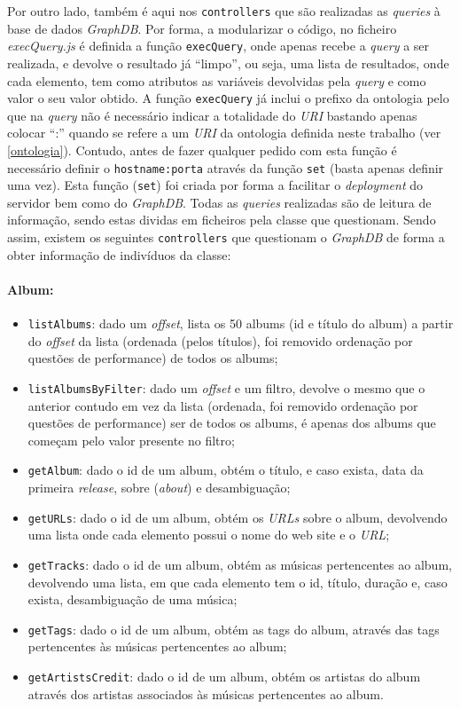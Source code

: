 \documentclass{article}
\begin{document}
Por outro lado, também é aqui nos \texttt{controllers} que são realizadas as \textit{queries} à base de dados \textit{GraphDB}. Por forma, a modularizar o código, no ficheiro \textit{execQuery.js} é definida a função \texttt{execQuery}, onde apenas recebe a \textit{query} a ser realizada, e devolve o resultado já ``limpo'', ou seja, uma lista de resultados, onde cada elemento, tem como atributos as variáveis devolvidas pela \textit{query} e como valor o seu valor obtido. A função \texttt{execQuery} já inclui o prefixo da ontologia pelo que na \textit{query} não é necessário indicar a totalidade do \textit{URI} bastando apenas colocar ``:'' quando se refere a um \textit{URI} da ontologia definida neste trabalho (ver \ref{ontologia}). Contudo, antes de fazer qualquer pedido com esta função é necessário definir o \texttt{hostname:porta} através da função \texttt{set} (basta apenas definir uma vez). Esta função (\texttt{set}) foi criada por forma a facilitar o \textit{deployment} do servidor bem como do \textit{GraphDB}. Todas as \textit{queries} realizadas são de leitura de informação, sendo estas dividas em ficheiros pela classe que questionam. Sendo assim, existem os seguintes \texttt{controllers} que questionam o \textit{GraphDB} de forma a obter informação de indivíduos da classe:

\paragraph{\textbf{Album:}}
    \begin{itemize}
        \item \texttt{listAlbums}: dado um \textit{offset}, lista os 50 albums (id e título do album) a partir do \textit{offset} da lista (ordenada (pelos títulos), foi removido ordenação por questões de performance) de todos os albums;
        \item \texttt{listAlbumsByFilter}: dado um \textit{offset} e um filtro, devolve o mesmo que o anterior contudo em vez da lista (ordenada, foi removido ordenação por questões de performance) ser de todos os albums, é apenas dos albums que começam pelo valor presente no filtro;
        \item \texttt{getAlbum}: dado o id de um album, obtém o título, e caso exista, data da primeira \textit{release}, sobre (\textit{about}) e desambiguação;
        \item \texttt{getURLs}: dado o id de um album, obtém os \textit{URLs} sobre o album, devolvendo uma lista onde cada elemento possui o nome do web site e o \textit{URL};
        \item \texttt{getTracks}: dado o id de um album, obtém as músicas pertencentes ao album, devolvendo uma lista, em que cada elemento tem o id, título, duração e, caso exista, desambiguação de uma música;
        \item \texttt{getTags}: dado o id de um album, obtém as tags do album, através das tags pertencentes às músicas pertencentes ao album;
        \item \texttt{getArtistsCredit}: dado o id de um album, obtém os artistas do album através dos artistas associados às músicas pertencentes ao album.
    \end{itemize}
\end{document}
